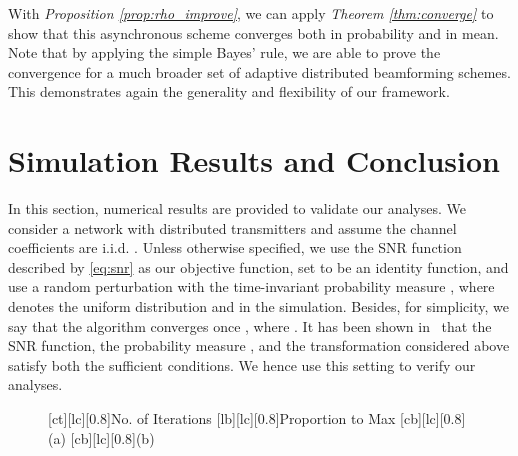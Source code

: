 \documentclass{article}
\newcommand{\ADB}{adaptive distributed beamforming }
\begin{document}
With \textit{Proposition \ref{prop:rho_improve}}, we can apply \textit{Theorem \ref{thm:converge}} to show that this asynchronous scheme converges both in probability and in mean. Note that by applying the simple Bayes' rule, we are able to prove the convergence for a much broader set of \ADB schemes. This demonstrates again the generality and flexibility of our framework.



\vspace{-0.20cm}
\section{Simulation Results and Conclusion}\label{sec:sim}
\vspace{-0.20cm}
In this section, numerical results are provided to validate our analyses. We consider a network with  distributed transmitters and assume the channel coefficients are i.i.d. . Unless otherwise specified, we use the SNR function described by \eqref{eq:snr} as our objective function, set  to be an identity function, and use a random perturbation with the time-invariant probability measure , where  denotes the uniform distribution and  in the simulation. Besides, for simplicity, we say that the algorithm converges once , where . It has been shown in~\cite{Lin10} that the SNR function, the probability measure , and the transformation  considered above satisfy both the sufficient conditions. We hence use this setting to verify our analyses.




\begin{figure}[tb]
[ct][lc][0.8]{No. of Iterations}
[lb][lc][0.8]{Proportion to Max}
[cb][lc][0.8]{(a)}
[cb][lc][0.8]{(b)}
\end{figure}
\end{document}
